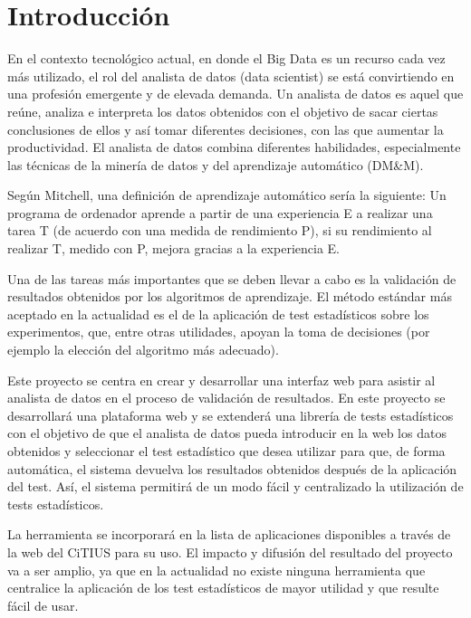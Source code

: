 \chapter{Introducción}
En el contexto tecnológico actual, en donde el Big Data es un recurso cada vez más
utilizado, el rol del analista de datos (data scientist) se está convirtiendo en una profesión
emergente y de elevada demanda. Un analista de datos es aquel que reúne, analiza e interpreta
los datos obtenidos con el objetivo de sacar ciertas conclusiones de ellos y así tomar diferentes
decisiones, con las que aumentar la productividad. El analista de datos combina diferentes
habilidades, especialmente las técnicas de la minería de datos y del aprendizaje automático (DM\&M).

Según Mitchell, una definición de aprendizaje automático sería la siguiente: Un programa de
ordenador aprende a partir de una experiencia E a realizar una tarea T (de acuerdo con una medida
de rendimiento P), si su rendimiento al realizar T, medido con P, mejora gracias a la experiencia E.

Una de las tareas más importantes que se deben llevar a cabo es la validación de resultados
obtenidos por los algoritmos de aprendizaje. El método estándar más aceptado en la actualidad
es el de la aplicación de test estadísticos sobre los experimentos, que, entre otras utilidades,
apoyan la toma de decisiones (por ejemplo la elección del algoritmo más adecuado).

Este proyecto se centra en crear y desarrollar una interfaz web para asistir al analista de
datos en el proceso de validación de resultados. En este proyecto se desarrollará una plataforma web
y se extenderá una librería de tests estadísticos con el objetivo de que el analista de datos
pueda introducir en la web los datos obtenidos y seleccionar el test estadístico que desea
utilizar para que, de forma automática, el sistema devuelva los resultados obtenidos después de
la aplicación del test. Así, el sistema permitirá de un modo fácil y centralizado la utilización de
tests estadísticos.

La herramienta se incorporará en la lista de aplicaciones disponibles a través de la web del
CiTIUS para su uso. El impacto y difusión del resultado del proyecto va a ser amplio, ya que en la
actualidad no existe ninguna herramienta que centralice la aplicación de los test estadísticos de mayor
utilidad y que resulte fácil de usar.

